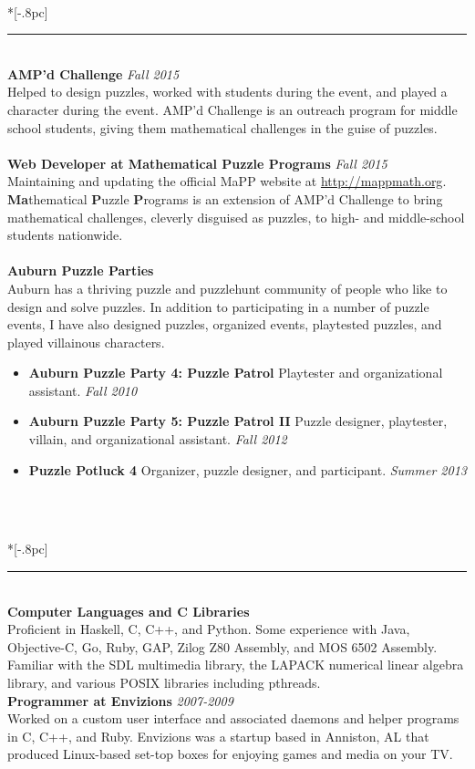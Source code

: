 \documentclass{article}
\begin{document}
 \\*[-.8pc]
\rule{\textwidth}{.1pt} \\
\textbf{AMP'd Challenge} \hfill \textit{Fall 2015}\\
Helped to design puzzles, worked with students during the event, and played a
character during the event. AMP'd Challenge is an outreach program for middle
school students, giving them
mathematical challenges in the guise of puzzles.  \\
\\
\textbf{Web Developer at Mathematical Puzzle Programs} \hfill \textit{Fall 2015}\\
Maintaining and updating the official MaPP website at
\url{http://mappmath.org}. \textbf{Ma}thematical \textbf{P}uzzle \textbf{P}rograms
is an extension of AMP'd Challenge to bring mathematical challenges, cleverly
disguised as puzzles, to high- and middle-school students nationwide.\\
\\
\textbf{Auburn Puzzle Parties}\\
Auburn has a thriving puzzle and puzzlehunt community of people who like to
design and solve puzzles. In addition to participating in a number of puzzle
events, I have also designed puzzles, organized events, playtested puzzles, and
played villainous characters.
\begin{itemize}[noitemsep]
\item \textbf{Auburn Puzzle Party 4: Puzzle Patrol} Playtester and
  organizational assistant. \hfill \textit{Fall 2010}
\item \textbf{Auburn Puzzle Party 5: Puzzle Patrol II} Puzzle designer,
  playtester, villain, and organizational assistant. \hfill \textit{Fall 2012}
\item \textbf{Puzzle Potluck 4} Organizer, puzzle designer, and
  participant. \hfill \textit{Summer 2013}
\end{itemize}

\

 \\*[-.8pc]
\rule{\textwidth}{.1pt} \\
{\bf Computer Languages and C Libraries} \\
Proficient in Haskell, C, C++, and Python. Some experience with Java,
Objective-C, Go, Ruby, GAP, Zilog Z80 Assembly, and MOS 6502 Assembly. Familiar
with the SDL multimedia library, the LAPACK numerical linear algebra library,
and various POSIX libraries including pthreads. \\
\newpage
\noindent \textbf{Programmer at Envizions} \hfill \textit{2007-2009}\\
Worked on a custom user interface and associated daemons and helper
programs in C, C++, and Ruby. Envizions was a startup based in Anniston, AL that
produced Linux-based set-top boxes for enjoying games and media on your TV.
\end{document}
